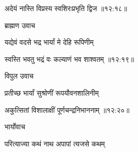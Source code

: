 
{\devanagarifont अदेयं नास्ति विप्रस्य स्वशिरःप्रभृति द्विज {॥१२:१८॥} \veg\dontdisplaylinenum }%

{\devanagarifont ब्राह्मण उवाच {\dandab}\dontdisplaylinenum  }%

{\devanagarifont यद्येवं वदसे भद्र भार्यां मे देहि रूपिणीम् \thinspace{\danda} \dontdisplaylinenum }%


{\devanagarifont स्वस्ति भवतु भद्रं वः कल्याणं भव शाश्वतम् {॥१२:१९॥} \veg\dontdisplaylinenum }%

{\devanagarifont विपुल उवाच {\dandab}\dontdisplaylinenum  }%

{\devanagarifont प्रतीच्छ भार्यां सुश्रोणीं रूपयौवनशालिनीम् \thinspace{\danda} \dontdisplaylinenum }%


{\devanagarifont अकुत्सितां विशालाक्षीं पूर्णचन्द्रनिभाननाम् {॥१२:२०॥} \veg\dontdisplaylinenum }%

{\devanagarifont भार्योवाच {\dandab}\dontdisplaylinenum  }%
 
{\devanagarifont परित्याज्या कथं नाथ अपापां त्यजसे कथम् \thinspace{\danda} \dontdisplaylinenum }%

